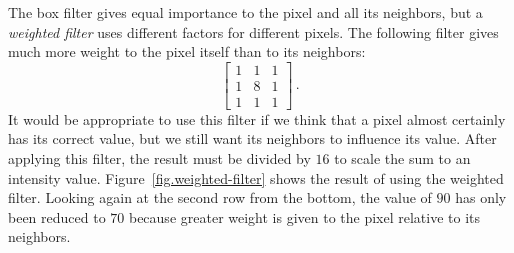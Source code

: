 
The box filter gives equal importance to the pixel and all its neighbors, but a \emph{weighted filter} uses different factors for different pixels. The following filter gives much more weight to the pixel itself than to its neighbors:
\[
\left[
\begin{array}{ccc}
1 & 1 & 1\\
1 & 8 & 1\\
1 & 1 & 1
\end{array}
\right]\,.
\]
It would be appropriate to use this filter if we think that a pixel almost certainly has its correct value, but we still want its neighbors to influence its value. After applying this filter, the result must be divided by $16$ to scale the sum to an intensity value. Figure~\ref{fig.weighted-filter} shows the result of using the weighted filter. Looking again at the second row from the bottom, the value of $90$ has only been reduced to $70$ because greater weight is given to the pixel relative to its neighbors.

